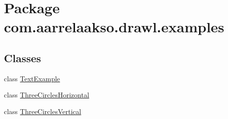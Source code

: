 \hypertarget{namespacecom_1_1aarrelaakso_1_1drawl_1_1examples}{}\section{Package com.\+aarrelaakso.\+drawl.\+examples}
\label{namespacecom_1_1aarrelaakso_1_1drawl_1_1examples}
\subsection*{Classes}
\begin{DoxyCompactItemize}
\item 
class \hyperlink{classcom_1_1aarrelaakso_1_1drawl_1_1examples_1_1_text_example}{Text\+Example}
\item 
class \hyperlink{classcom_1_1aarrelaakso_1_1drawl_1_1examples_1_1_three_circles_horizontal}{Three\+Circles\+Horizontal}
\item 
class \hyperlink{classcom_1_1aarrelaakso_1_1drawl_1_1examples_1_1_three_circles_vertical}{Three\+Circles\+Vertical}
\end{DoxyCompactItemize}
